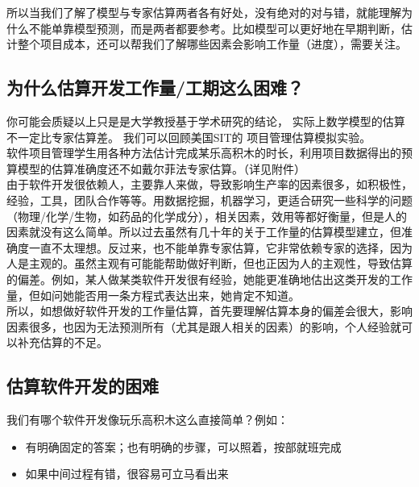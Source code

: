 所以当我们了解了模型与专家估算两者各有好处，没有绝对的对与错，就能理解为什么不能单靠模型预测，而是两者都要参考。比如模型可以更好地在早期判断，估计整个项目成本，还可以帮我们了解哪些因素会影响工作量（进度），需要关注。\\

\hypertarget{ux4e3aux4ec0ux4e48ux4f30ux7b97ux5f00ux53d1ux5de5ux4f5cux91cfux5de5ux671fux8fd9ux4e48ux56f0ux96be}{%
\subsection{为什么估算开发工作量/工期这么困难？}\label{ux4e3aux4ec0ux4e48ux4f30ux7b97ux5f00ux53d1ux5de5ux4f5cux91cfux5de5ux671fux8fd9ux4e48ux56f0ux96be}}

你可能会质疑以上只是是大学教授基于学术研究的结论，
实际上数学模型的估算不一定比专家估算差。 我们可以回顾美国SIT的
项目管理估算模拟实验。\\
软件项目管理学生用各种方法估计完成某乐高积木的时长，利用项目数据得出的预算模型的估算准确度还不如戴尔菲法专家估算。（详见附件）\\
由于软件开发很依赖人，主要靠人来做，导致影响生产率的因素很多，如积极性，经验，工具，团队合作等等。用数据挖掘，机器学习，更适合研究一些科学的问题
（物理/化学/生物，如药品的化学成分），相关因素，效用等都好衡量，但是人的因素就没有这么简单。所以过去虽然有几十年的关于工作量的估算模型建立，但准确度一直不太理想。反过来，也不能单靠专家估算，它非常依赖专家的选择，因为人是主观的。虽然主观有可能能帮助做好判断，但也正因为人的主观性，导致估算的偏差。例如，某人做某类软件开发很有经验，她能更准确地估出这类开发的工作量，但如问她能否用一条方程式表达出来，她肯定不知道。\\
所以，如想做好软件开发的工作量估算，首先要理解估算本身的偏差会很大，影响因素很多，也因为无法预测所有（尤其是跟人相关的因素）的影响，个人经验就可以补充估算的不足。

\hypertarget{ux4f30ux7b97ux8f6fux4ef6ux5f00ux53d1ux7684ux56f0ux96be}{%
\subsection{估算软件开发的困难}\label{ux4f30ux7b97ux8f6fux4ef6ux5f00ux53d1ux7684ux56f0ux96be}}

我们有哪个软件开发像玩乐高积木这么直接简单？例如：

\begin{itemize}
\tightlist
\item
  有明确固定的答案；也有明确的步骤，可以照着，按部就班完成
\item
  如果中间过程有错，很容易可立马看出来
\end{itemize}

